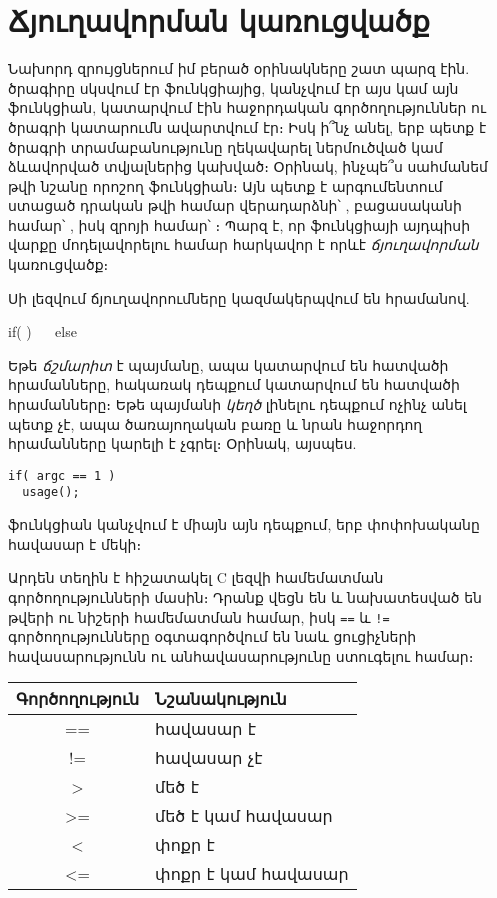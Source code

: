 \chapter{Ճյուղավորման կառուցվածք}

Նախորդ զրույցներում իմ բերած օրինակները շատ պարզ էին. ծրագիրը սկսվում
էր  ֆունկցիայից, կանչվում էր այս կամ այն ֆունկցիան, կատարվում
էին հաջորդական գործողություններ ու ծրագրի կատարումն ավարտվում էր։ Իսկ
ի՞նչ անել, երբ պետք է ծրագրի տրամաբանությունը ղեկավարել ներմուծված կամ
ձևավորված տվյալներից կախված։ Օրինակ, ինչպե՞ս սահմանեմ թվի նշանը որոշող
 ֆունկցիան։ Այն պետք է արգումենտում ստացած դրական թվի
համար վերադարձնի՝ , բացասականի համար՝ , իսկ զրոյի
համար՝ ։ Պարզ է, որ ֆունկցիայի այդպիսի վարքը մոդելավորելու համար
հարկավոր է որևէ \emph{ճյուղավորման} կառուցվածք։

Սի լեզվում ճյուղավորումները կազմակերպվում են  հրամանով.

\begin{syntax}
if(  )
~~
else
~~
\end{syntax}

Եթե \emph{ճշմարիտ} է  պայմանը, ապա կատարվում
են  հատվածի հրամանները, հակառակ դեպքում կատարվում
են  հատվածի հրամանները։ Եթե պայմանի \emph{կեղծ}
լինելու դեպքում ոչինչ անել պետք չէ, ապա  ծառայողական բառը
և նրան հաջորդող  հրամանները կարելի է չգրել։
Օրինակ, այսպես.

\begin{Verbatim}
if( argc == 1 )
  usage();
\end{Verbatim}

 ֆունկցիան կանչվում է միայն այն դեպքում, երբ 
փոփոխականը հավասար է մեկի։

Արդեն տեղին է հիշատակել C լեզվի համեմատման գործողությունների մասին։ Դրանք
վեցն են և նախատեսված են թվերի ու նիշերի համեմատման համար, իսկ \verb|==| և
\verb|!=| գործողությունները օգտագործվում են նաև ցուցիչների հավասարությունն
ու անհավասարությունը ստուգելու համար։

\begin{center}
\small
\begin{tabular}{c|l}
Գործողություն & Նշանակություն \\
\hline
== & հավասար է \\
!= & հավասար չէ \\
>  & մեծ է \\
>= & մեծ է կամ հավասար \\
<  & փոքր է \\
<= & փոքր է կամ հավասար \\
\end{tabular}
\end{center}

